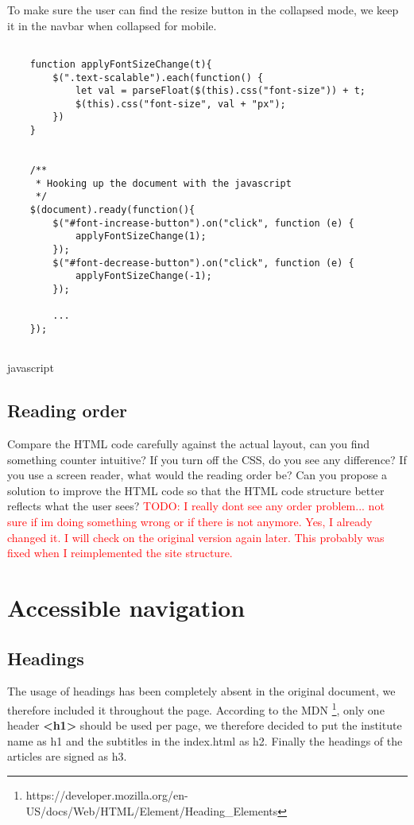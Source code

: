 \documentclass[a4paper,11pt]{article}
\newcommand\todo[1]{\textcolor{red}{TODO: #1}}
\theoremstyle{mytheor}
\begin{document}
To make sure the user can find the resize button in the collapsed mode, we keep it in the navbar when collapsed for mobile.


\begin{verbatim}
    
    function applyFontSizeChange(t){
        $(".text-scalable").each(function() {
            let val = parseFloat($(this).css("font-size")) + t;
            $(this).css("font-size", val + "px");
        })
    }
    
    
    /**
     * Hooking up the document with the javascript
     */
    $(document).ready(function(){
        $("#font-increase-button").on("click", function (e) {
            applyFontSizeChange(1);
        });
        $("#font-decrease-button").on("click", function (e) {
            applyFontSizeChange(-1);
        });
        
        ...
    });
    
\end{verbatim}{javascript}

\subsection{Reading order}
Compare the HTML code carefully against the actual layout, can you find something counter intuitive? If you turn off the CSS, do you see any difference? If you use a screen reader, what would the
reading order be?
Can you propose a solution to improve the HTML code so that the HTML code structure better reflects what the user sees?
\todo{
I really dont see any order problem... not sure if im doing something wrong or if there is not anymore. Yes, I already changed it. I will check on the original version again later. This probably was fixed when I reimplemented the site structure. }

\section{Accessible navigation}
\subsection{Headings}
The usage of headings has been completely absent in the original document, 
we therefore included it throughout the page. According to the MDN \footnote{https://developer.mozilla.org/en-US/docs/Web/HTML/Element/Heading_Elements}, only one header \textbf{<h1>} should be used per page, we therefore decided to put the institute name as h1 and the subtitles in the index.html as h2. Finally the headings of the articles are signed as h3. 
\end{document}
